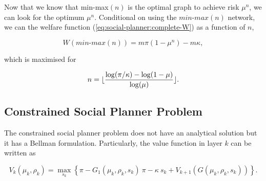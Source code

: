\documentclass[../../main.tex]{subfiles}
\begin{document}
Now that we know that min-max$(n)$ is the optimal graph to achieve risk $\mu^n$, we can look for the optimum $\mu^n$. Conditional on using the $\textit{min-max}(n)$ network, we can the welfare function (\ref{eq:social-planner:complete-W}) as a function of $n$,

\begin{equation}
  W(\textit{min-max}(n)) = m \pi (1 - \mu^n) - m \kappa,
\end{equation}

which is maximised for 

\begin{equation}
  n = \lfloor \frac{\log(\pi / \kappa) - \log(1 - \mu)}{\log(\mu)} \rfloor.
\end{equation}


\subsection{Constrained Social Planner Problem} \label{sec:planner:constrained}

The constrained social planner problem does not have an analytical solution but it has a Bellman formulation. Particularly, the value function in layer $k$ can be written as

\begin{equation}
  V_k(\mu_k, \rho_k) = \max_{s_k} \left\{ \pi - G_1(\mu_k, \rho_k, s_k) \ \pi - \kappa \  s_k + V_{k + 1}(G(\mu_k, \rho_k, s_k)) \right\}.
\end{equation}

\end{document}

